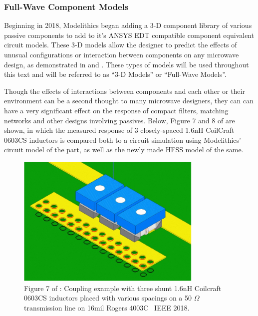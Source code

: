 \documentclass[12pt]{usfcoe}
\begin{document}
    \subsubsection{Full-Wave Component Models}
    
    Beginning in 2018, Modelithics began adding a 3-D component library of various passive components to add  to it's ANSYS EDT compatible component equivalent circuit models. These 3-D models allow the designer to predict the effects of unusual configurations or interaction between components on any microwave design, as demonstrated in \cite{mdlx_3d_models} and \cite{HFSS_3d_components}. 
    These types of models will be used throughout this text and will be referred to as ``3-D Models'' or ``Full-Wave Models''.
    
    Though the effects of interactions between components and each other or their environment can be a second thought to many microwave designers, they can can have a very significant effect on the response of compact filters, matching networks and other designs involving passives.  
    Below, Figure 7 and 8 of \cite{mdlx_3d_models} are shown, in which the measured response of 3 closely-spaced 1.6nH CoilCraft 0603CS inductors is compared both to a circuit simulation using Modelithics' circuit model of the part, as well as the newly made HFSS model of the same.
    
    \begin{figure}[H]
        \begin{center}
        \includegraphics[width=3.5in]{images/mdlx3d_comps_paper_fig_7.jpg}
        \caption{Figure 7 of \cite{mdlx_3d_models}: Coupling example with three shunt 1.6nH Coilcraft 0603CS inductors placed with various spacings on a 50 $\Omega$ transmission line on 16mil Rogers 4003C \textcopyright \,  IEEE 2018.} 
        \label{fig:mdlx3d_comps_paper_fig_7}
        \end{center}
    \end{figure}
\end{document}
